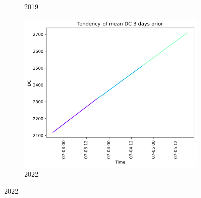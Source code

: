 \begin{figure}[h]
\begin{subfigure}{0.3\textwidth}
		\caption{2019}
		\label{fig:dc_prior_3_days_2019}
	\end{subfigure}
	\hfill
	\begin{subfigure}{0.3\textwidth}
		\centering
		\includegraphics[width=\textwidth]{graphs/3days/2022_3daysprior_tendency_graph_DC.png}
		\caption{2022}
		\label{fig:dc_prior_3_days_2022}
	\end{subfigure}
	
	\label{fig:dc_values_3days_prior}
\end{figure}

